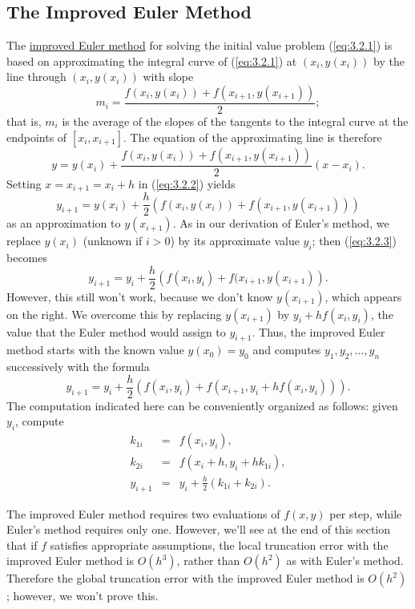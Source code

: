 \documentclass{ximera}
\begin{document}
\subsection*{The Improved Euler Method}

The
\href{http://www-history.mcs.st-and.ac.uk/Mathematicians/Euler.html}{improved Euler method} for solving the initial value
problem (\ref{eq:3.2.1}) is based on approximating the integral curve of
(\ref{eq:3.2.1}) at $(x_i,y(x_i))$ by the line through $(x_i,y(x_i))$ with
slope
$$
m_i=\frac{f(x_i,y(x_i))+f(x_{i+1},y(x_{i+1}))}{2};
$$
that is, $m_i$ is the average of the slopes of the tangents to the
integral curve at the endpoints of $[x_i,x_{i+1}]$. The equation of
the approximating line is therefore
\begin{equation} \label{eq:3.2.2}
y=y(x_i)+\frac{f(x_i,y(x_i))+f(x_{i+1},y(x_{i+1}))}{2}(x-x_i).
\end{equation}
Setting $x=x_{i+1}=x_i+h$ in (\ref{eq:3.2.2}) yields
\begin{equation} \label{eq:3.2.3}
y_{i+1}=y(x_i)+\frac{h}{2}\left(f(x_i,y(x_i))+f(x_{i+1},y(x_{i+1}))\right)
\end{equation}
as an approximation to $y(x_{i+1})$. As in our derivation of Euler's
method, we replace $y(x_i)$ (unknown if $i>0$) by its
approximate value $y_i$; then (\ref{eq:3.2.3}) becomes
$$
y_{i+1}=y_i+\frac{h}{2}\left(f(x_i,y_i)+f(x_{i+1},y(x_{i+1})\right).
$$
However, this still won't work, because we don't know $y(x_{i+1})$,
which appears on the right. We overcome this by replacing $y(x_{i+1})$
by $y_i+hf(x_i,y_i)$, the value that the  Euler method would
assign to $y_{i+1}$. Thus,  the improved Euler method
starts with the known value $y(x_0)=y_0$ and computes
$y_1, y_2, \dots, y_n$ successively with the formula
\begin{equation} \label{eq:3.2.4}
y_{i+1}=y_i+\frac{h}{2}\left(f(x_i,y_i)+f(x_{i+1},y_i+hf(x_i,y_i))\right).
\end{equation}
The computation indicated here can be conveniently organized as
follows: given $y_i$, compute
\begin{eqnarray*}
k_{1i}&=&f(x_i,y_i),\\
k_{2i}&=&f\left(x_i+h,y_i+hk_{1i}\right),\\
y_{i+1}&=&y_i+\frac{h}{2}(k_{1i}+k_{2i}).
\end{eqnarray*}

The improved Euler method requires two evaluations of $f(x,y)$ per
step, while Euler's method requires only one. However, we'll see at
the end of this section that if $f$ satisfies appropriate assumptions,
 the local truncation error with the improved Euler method is
$O(h^3)$, rather than $O(h^2)$ as with Euler's method. Therefore
the global truncation error with the improved Euler method is
$O(h^2)$;     however, we won't prove this.
\end{document}
